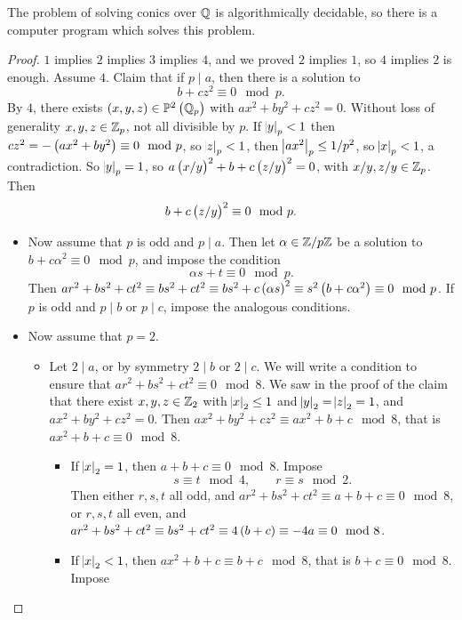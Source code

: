 The problem of solving conics over $ \mathbb{Q} $ is algorithmically decidable, so there is a computer program which solves this problem.

\pagebreak

\begin{proof}
$ 1 $ implies $ 2 $ implies $ 3 $ implies $ 4 $, and we proved $ 2 $ implies $ 1 $, so $ 4 $ implies $ 2 $ is enough. Assume $ 4 $. Claim that if $ p \mid a $, then there is a solution to
$$ b + cz^2 \equiv 0 \mod p. $$
By $ 4 $, there exists $ \br{x, y, z} \in \PP^2\br{\QQ_p} $ with $ ax^2 + by^2 + cz^2 = 0 $. Without loss of generality $ x, y, z \in \mathbb{Z}_p $, not all divisible by $ p $. If $ \abs{y}_p < 1 $ then $ cz^2 = -\br{ax^2 + by^2} \equiv 0 \mod p $, so $ \abs{z}_p < 1 $, then $ \abs{ax^2}_p \le 1 / p^2 $, so $ \abs{x}_p < 1 $, a contradiction. So $ \abs{y}_p = 1 $, so $ a\br{x / y}^2 + b + c\br{z / y}^2 = 0 $, with $ x / y, z / y \in \mathbb{Z}_p $. Then
$$ b + c\br{z / y}^2 \equiv 0 \mod p. $$
\begin{itemize}
\item Now assume that $ p $ is odd and $ p \mid a $. Then let $ \alpha \in \mathbb{Z} / p\mathbb{Z} $ be a solution to $ b + c\alpha^2 \equiv 0 \mod p $, and impose the condition
$$ \alpha s + t \equiv 0 \mod p. $$
Then $ ar^2 + bs^2 + ct^2 \equiv bs^2 + ct^2 \equiv bs^2 + c\br{\alpha s}^2 \equiv s^2\br{b + c\alpha^2} \equiv 0 \mod p $. If $ p $ is odd and $ p \mid b $ or $ p \mid c $, impose the analogous conditions.
\item Now assume that $ p = 2 $.
\begin{itemize}
\item Let $ 2 \mid a $, or by symmetry $ 2 \mid b $ or $ 2 \mid c $. We will write a condition to ensure that $ ar^2 + bs^2 + ct^2 \equiv 0 \mod 8 $. We saw in the proof of the claim that there exist $ x, y, z \in \mathbb{Z}_2 $ with $ \abs{x}_2 \le 1 $ and $ \abs{y}_2 = \abs{z}_2 = 1 $, and $ ax^2 + by^2 + cz^2 = 0 $. Then $ ax^2 + by^2 + cz^2 \equiv ax^2 + b + c \mod 8 $, that is $ ax^2 + b + c \equiv 0 \mod 8 $.
\begin{itemize}
\item If $ \abs{x}_2 = 1 $, then $ a + b + c \equiv 0 \mod 8 $. Impose
$$ s \equiv t \mod 4, \qquad r \equiv s \mod 2. $$
Then either $ r, s, t $ all odd, and $ ar^2 + bs^2 + ct^2 \equiv a + b + c \equiv 0 \mod 8 $, or $ r, s, t $ all even, and $ ar^2 + bs^2 + ct^2 \equiv bs^2 + ct^2 \equiv 4\br{b + c} \equiv -4a \equiv 0 \mod 8 $.
\item If $ \abs{x}_2 < 1 $, then $ ax^2 + b + c \equiv b + c \mod 8 $, that is $ b + c \equiv 0 \mod 8 $. Impose

\end{itemize}
\end{itemize}
\end{itemize}
\end{proof}
